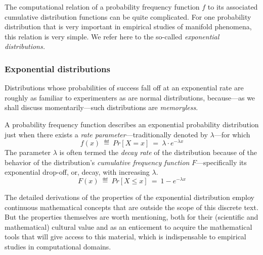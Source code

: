 \bigskip

The computational relation of a probability frequency function $f$ to its associated cumulative distribution functions can be quite complicated.  For one probability distribution that is very important in empirical studies of manifold phenomena, this relation is very simple.  We refer here to the so-called {\em exponential distributions.}



\subsubsection{Exponential distributions} 
\label{sec:exponential-distr}

Distributions whose probabilities of success fall off at an exponential rate are roughly as familiar to experimenters as are normal distributions, because---as we shall discuss momentarily---such distributions are {\em memoryless}.

\medskip

A probability frequency function describes an exponential probability distribution just when there exists a {\em rate parameter}---traditionally denoted by $\lambda$---for which
\[ f(x) \ \eqdef \ Pr[X=x] \ = \ \lambda \cdot e^{-\lambda x} \]
The parameter $\lambda$ is often termed the {\em decay rate} of the distribution because of the behavior of the distribution's {\em cumulative frequency function} $F$---specifically its exponential drop-off, or, decay, with increasing $\lambda$.
\[ F(x) \ \eqdef \ Pr[X \leq x] \ = \ 1 - e^{-\lambda x} \]

 
 

\medskip

The detailed derivations of the properties of the exponential distribution employ continuous mathematical concepts that are outside the scope of this discrete text.  But the properties themselves are worth mentioning, both for their (scientific and mathematical) cultural value and as an enticement to acquire the mathematical tools that will give access to this material, which is indispensable to empirical studies in computational domains.

